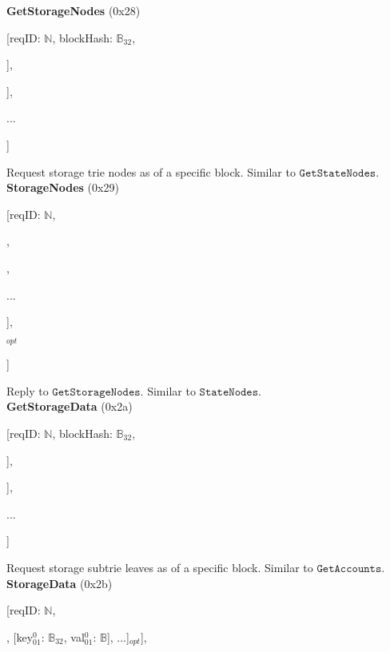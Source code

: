 \documentclass{amsart}
\begin{document}
\textbf{GetStorageNodes} (0x28)

[reqID: $\mathbb{N}$, blockHash: $\mathbb{B}_{32}$,

\quad [accountAddress$^0$: $\mathbb{B}_{20}$, [prefix$^0_0$: $\mathbb{Y}$, prefix$^0_1$: $\mathbb{Y}$, ...]],

\quad [accountAddress$^1$: $\mathbb{B}_{20}$, [prefix$^1_0$: $\mathbb{Y}$, prefix$^1_1$: $\mathbb{Y}$, ...]],

\quad ...

]
\medskip

Request storage trie nodes as of a specific block.
Similar to $\texttt{GetStateNodes}$.\\

\textbf{StorageNodes} (0x29)

[reqID: $\mathbb{N}$,

\quad [

\qquad [node$^0_0$: $\mathbb{B}$, node$^0_1$: $\mathbb{B}$, ...],

,

\qquad ...

\quad ],

$_{opt}$

]
\medskip

Reply to $\texttt{GetStorageNodes}$.
Similar to $\texttt{StateNodes}$.\\

\textbf{GetStorageData} (0x2a)

[reqID: $\mathbb{N}$, blockHash: $\mathbb{B}_{32}$,

\quad [accountAddress$^0$: $\mathbb{B}_{20}$, [prefix$^0_0$: $\mathbb{Y}$, prefix$^0_1$: $\mathbb{Y}$, ...]],

\quad [accountAddress$^1$: $\mathbb{B}_{20}$, [prefix$^1_0$: $\mathbb{Y}$, prefix$^1_1$: $\mathbb{Y}$, ...]],

\quad ...

]
\medskip

Request storage subtrie leaves as of a specific block.
Similar to $\texttt{GetAccounts}$.\\

\textbf{StorageData} (0x2b)
\nopagebreak

[reqID: $\mathbb{N}$,

\quad [

\qquad [

\quad \qquad [status$^0_0$: $\mathbb{N}$, [[key$^0_{00}$: $\mathbb{B}_{32}$, val$^0_{00}$: $\mathbb{B}$], [key$^0_{01}$: $\mathbb{B}_{32}$, val$^0_{01}$: $\mathbb{B}$], ...]$_{opt}$],
\end{document}

